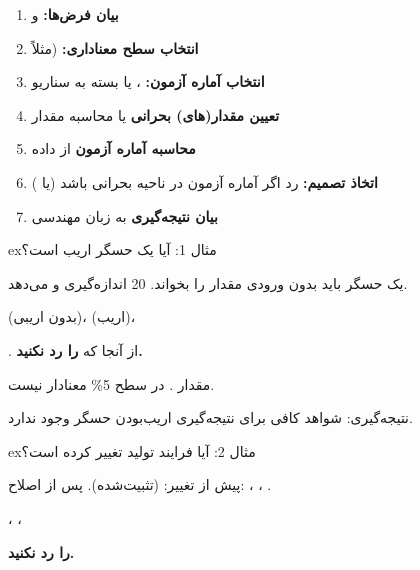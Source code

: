 
\begin{enumerate}
\def\labelenumi{\arabic{enumi}.}
\tightlist
\item
  \textbf{بیان فرض‌ها:}  و 
\item
  \textbf{انتخاب سطح معناداری:} \lr{\ensuremath{\alpha}} (مثلاً 
\item
  \textbf{انتخاب آماره آزمون:} ،  یا  بسته به سناریو
\item
  \textbf{تعیین مقدار(های) بحرانی} یا محاسبه مقدار 
\item
  \textbf{محاسبه آماره آزمون} از داده
\item
  \textbf{اتخاذ تصمیم:} رد  اگر آماره آزمون در ناحیه بحرانی باشد (یا )
\item
  \textbf{بیان نتیجه‌گیری} به زبان مهندسی
\end{enumerate}


\begin{PSbox}[unbreakable]{ex}{مثال 1: آیا یک حسگر اریب است؟}

یک حسگر باید بدون ورودی مقدار  را بخواند. 20 اندازه‌گیری  و  می‌دهد.

 (بدون اریبی)،  (اریب)، 


. از آنجا که  \textbf{ را رد نکنید.}

مقدار . در سطح 5\% معنادار نیست.

نتیجه‌گیری: شواهد کافی برای نتیجه‌گیری اریب‌بودن حسگر وجود ندارد.

\end{PSbox}

\begin{PSbox}[unbreakable]{ex}{مثال 2: آیا فرایند تولید تغییر کرده است؟}

پیش از تغییر:  (تثبیت‌شده). پس از اصلاح: ، ، .

، ، 


 \textbf{ را رد نکنید.}

\end{PSbox}

